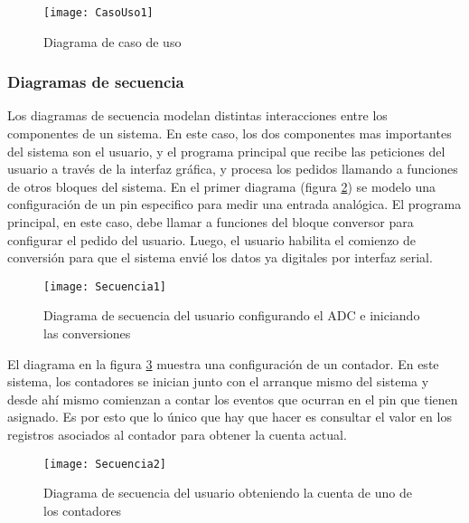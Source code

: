 \begin{figure}[h]
  \centering
  \texttt{[image: CasoUso1]}
  \caption{Diagrama de caso de uso}\label{fig:casouso1}
\end{figure}


\subsubsection{Diagramas de secuencia} %
\label{ssub:diagramas_de_secuencia}

Los diagramas de secuencia modelan distintas interacciones entre los componentes de un sistema. En este caso, los dos componentes mas importantes del sistema son el usuario, y el programa principal que recibe las peticiones del usuario a trav\'es de la interfaz gr\'afica, y procesa los pedidos llamando a funciones de otros bloques del sistema. En el primer diagrama (figura \ref{fig:secuencia1}) se modelo una configuraci\'on de un pin especifico para medir una entrada anal\'ogica. El programa principal, en este caso, debe llamar a funciones del bloque conversor para configurar el pedido del usuario. Luego, el usuario habilita el comienzo de conversi\'on para que el sistema envi\'e los datos ya digitales por interfaz serial.


\begin{figure}[h]
  \centering
  \texttt{[image: Secuencia1]}
  \caption{Diagrama de secuencia del usuario configurando el ADC e iniciando las conversiones}\label{fig:secuencia1}
\end{figure}

El diagrama en la figura \ref{fig:secuencia2} muestra una configuraci\'on de un contador. En este sistema, los contadores se inician junto con el arranque mismo del sistema y desde ah\'i mismo comienzan a contar los eventos que ocurran en el pin que tienen asignado. Es por esto que lo \'unico que hay que hacer es consultar el valor en los registros asociados al contador para obtener la cuenta actual.


\begin{figure}[h]
  \centering
  \texttt{[image: Secuencia2]}
  \caption{Diagrama de secuencia del usuario obteniendo la cuenta de uno de los contadores}\label{fig:secuencia2}
\end{figure}




\clearpage
